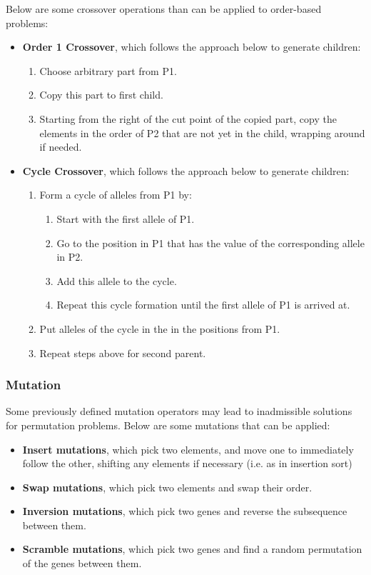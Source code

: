 \documentclass[12pt,titlepage]{article}
\begin{document}
        Below are some crossover operations than can be applied to order-based problems:
        \begin{itemize}
          \item \textbf{Order 1 Crossover}, which follows the approach below to generate children:
            \begin{enumerate}
              \item Choose arbitrary part from P1.
              \item Copy this part to first child.
              \item Starting from the right of the cut point of the copied part, copy the elements in the order of P2 that are not yet in the child, wrapping around if needed.
            \end{enumerate}
          \item \textbf{Cycle Crossover}, which follows the approach below to generate children:
            \begin{enumerate}
              \item Form a cycle of alleles from P1 by:
                \begin{enumerate}
                  \item Start with the first allele of P1.
                  \item Go to the position in P1 that has the value of the corresponding allele in P2.
                  \item Add this allele to the cycle.
                  \item Repeat this cycle formation until the first allele of P1 is arrived at.
                \end{enumerate}
              \item Put alleles of the cycle in the in the positions from P1.
              \item Repeat steps above for second parent.
            \end{enumerate}
        \end{itemize}

      \subsubsection{Mutation}
        Some previously defined mutation operators may lead to inadmissible solutions for permutation problems. Below are some mutations that can be applied:
        \begin{itemize}
          \item \textbf{Insert mutations}, which pick two elements, and move one to immediately follow the other, shifting any elements if necessary (i.e. as in
            insertion sort)
          \item \textbf{Swap mutations}, which pick two elements and swap their order.
          \item \textbf{Inversion mutations}, which pick two genes and reverse the subsequence between them.
          \item \textbf{Scramble mutations}, which pick two genes and find a random permutation of the genes between them.
        \end{itemize}
\end{document}
